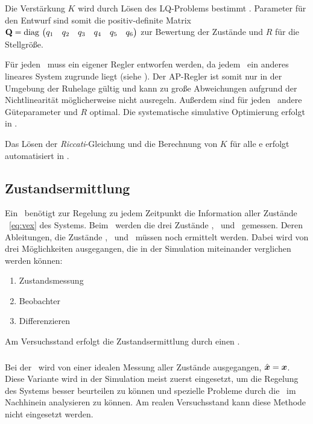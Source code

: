 Die Verstärkung $K$ wird durch Lösen des LQ-Problems bestimmt \cite{AdamyRT2}. Parameter für den Entwurf sind somit die positiv-definite Matrix 
${\boldsymbol{\mathrm{Q}}}=\mathrm{diag} \, \left(\begin{matrix} q_1 & q_2 & q_3 & q_4 & q_5 & q_6 \end{matrix}\right)$
 zur Bewertung der Zustände und $R$ für die Stellgröße. 

Für jeden \ap\ muss ein eigener Regler entworfen werden, da jedem \ap\ ein anderes lineares System zugrunde liegt (siehe ).
Der AP-Regler ist somit nur in der Umgebung der Ruhelage gültig und kann zu große Abweichungen aufgrund der Nichtlinearität möglicherweise nicht ausregeln.
Außerdem sind für jeden \ap\ andere Güteparameter  und $R$ optimal. Die systematische simulative Optimierung erfolgt in .

Das Lösen der \emph{Riccati}-Gleichung und die Berechnung von $K$ für alle \ap e erfolgt automatisiert in \ml.


\subsection{Zustandsermittlung}

Ein \zsr\ benötigt zur Regelung zu jedem Zeitpunkt die Information aller Zustände \vex\ \eqref{eq:vex} des Systems. Beim \spds\ werden die drei Zustände \xo, \phe\ und \phz\ gemessen. Deren Ableitungen, die Zustände \xop, \phep\ und \phzp\ müssen noch ermittelt werden. Dabei wird von drei Möglichkeiten ausgegangen, die in der Simulation miteinander verglichen werden können:
\begin{enumerate}
	\item Zustandsmessung
	\item Beobachter
	\item Differenzieren 
\end{enumerate}
Am Versuchsstand erfolgt die Zustandsermittlung durch einen \beob.

\subsubsection{\zm}
Bei der \zm\ wird von einer idealen Messung aller Zustände ausgegangen, \dah $\hat{\boldsymbol{x}}=\boldsymbol{x}$. 
Diese Variante wird in der Simulation meist zuerst eingesetzt, um die Regelung des Systems besser beurteilen zu können und spezielle Probleme durch die \ze\ im Nachhinein analysieren zu können.
Am realen Versuchsstand kann diese Methode nicht eingesetzt werden.

